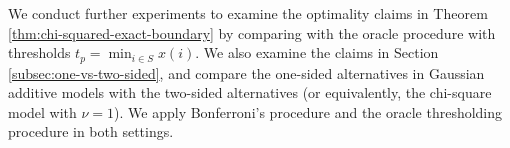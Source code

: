 
We conduct further experiments to examine the optimality claims in Theorem \ref{thm:chi-squared-exact-boundary} by comparing with the oracle procedure with thresholds $t_p=\min_{i\in S}x(i)$.
We also examine the claims in Section \ref{subsec:one-vs-two-sided}, and compare the one-sided alternatives in Gaussian additive models with the two-sided alternatives (or equivalently, the chi-square model with $\nu=1$).
We apply Bonferroni's procedure and the oracle thresholding procedure in both settings.

